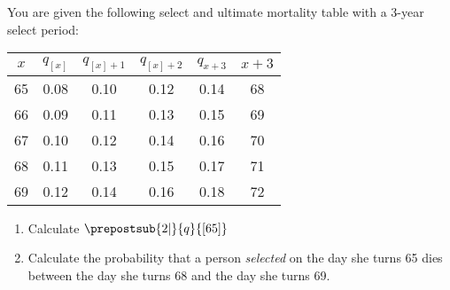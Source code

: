You are given the following select and ultimate mortality table with a 3-year select period:
     \begin{center}\begin{tabular}{cccccc} $x$ & $q_{[x]}$ & $q_{[x]+1}$ & $q_{[x]+2}$ & $q_{x+3}$ & $x+3$ \\ \hline
                                                                        65 & 0.08        & 0.10           & 0.12            & 0.14            & 68 \\ 
                                                                        66 & 0.09        & 0.11            & 0.13            & 0.15            & 69 \\ 
                                                                        67 & 0.10         & 0.12           & 0.14            & 0.16            & 70 \\ 
                                                                        68 & 0.11         & 0.13            & 0.15            & 0.17            & 71 \\ 
                                                                        69 & 0.12        & 0.14            & 0.16            & 0.18           & 72 
      \end{tabular}\end{center}
\begin{enumerate}
\item Calculate $\prepostsub{2|}{q}{[65]}$
\item Calculate the probability that a person {\em selected} on the day she turns 65 dies between the day she turns 68 and the day she turns 69. 
\end{enumerate}
